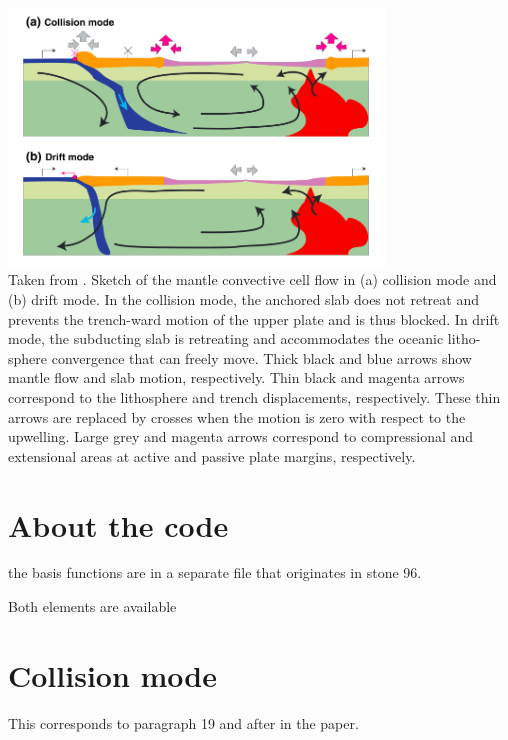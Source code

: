 \begin{center}
\includegraphics[width=10cm]{python_codes/fieldstone_143/images/yahb13_b}\\
{\captionfont 
Taken from \cite{yahb13}. 
Sketch of the mantle convective cell flow in (a) collision mode and (b) drift mode. In the
collision mode, the anchored slab does not retreat and prevents the trench-ward motion of the upper plate
and is thus blocked. In drift mode, the subducting slab is retreating and accommodates the oceanic litho-
sphere convergence that can freely move. Thick black and blue arrows show mantle flow and slab motion,
respectively. Thin black and magenta arrows correspond to the lithosphere and trench displacements,
respectively. These thin arrows are replaced by crosses when the motion is zero with respect to the upwelling.
Large grey and magenta arrows correspond to compressional and extensional areas at active and passive plate
margins, respectively.
}
\end{center}

\section*{About the code}

the basis functions are in a separate file that originates in stone 96.

Both elements are available



\section*{Collision mode}

This corresponds to paragraph 19 and after in the paper. 

